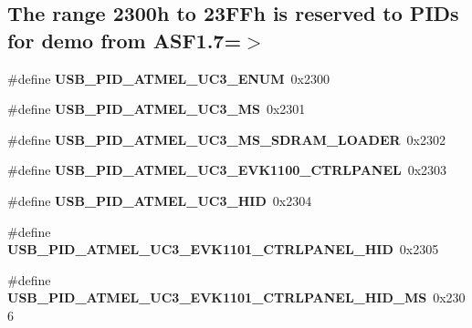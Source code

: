 \subsection*{The range 2300h to 23\+F\+Fh is reserved to P\+I\+Ds for demo from A\+S\+F1.7=$>$}
\begin{DoxyCompactItemize}
\item 
\mbox{\label{group__usb__atmel__ids__group_ga03434816426bc21bbb384f9afe149f1e}} 
\#define {\bfseries U\+S\+B\+\_\+\+P\+I\+D\+\_\+\+A\+T\+M\+E\+L\+\_\+\+U\+C3\+\_\+\+E\+N\+UM}~0x2300
\item 
\mbox{\label{group__usb__atmel__ids__group_ga3c3a8d8fc6c2d20b05e44b34a38c5159}} 
\#define {\bfseries U\+S\+B\+\_\+\+P\+I\+D\+\_\+\+A\+T\+M\+E\+L\+\_\+\+U\+C3\+\_\+\+MS}~0x2301
\item 
\mbox{\label{group__usb__atmel__ids__group_gaf5cf42327c8324b093b5a247d472b525}} 
\#define {\bfseries U\+S\+B\+\_\+\+P\+I\+D\+\_\+\+A\+T\+M\+E\+L\+\_\+\+U\+C3\+\_\+\+M\+S\+\_\+\+S\+D\+R\+A\+M\+\_\+\+L\+O\+A\+D\+ER}~0x2302
\item 
\mbox{\label{group__usb__atmel__ids__group_ga5abb96a63cda4c7fb60a5d56fe2158b2}} 
\#define {\bfseries U\+S\+B\+\_\+\+P\+I\+D\+\_\+\+A\+T\+M\+E\+L\+\_\+\+U\+C3\+\_\+\+E\+V\+K1100\+\_\+\+C\+T\+R\+L\+P\+A\+N\+EL}~0x2303
\item 
\mbox{\label{group__usb__atmel__ids__group_gae36d78d28923e15b4b58680c05d93946}} 
\#define {\bfseries U\+S\+B\+\_\+\+P\+I\+D\+\_\+\+A\+T\+M\+E\+L\+\_\+\+U\+C3\+\_\+\+H\+ID}~0x2304
\item 
\mbox{\label{group__usb__atmel__ids__group_ga90ee7ee99e3d7eecb8eeccc1e233eb0b}} 
\#define {\bfseries U\+S\+B\+\_\+\+P\+I\+D\+\_\+\+A\+T\+M\+E\+L\+\_\+\+U\+C3\+\_\+\+E\+V\+K1101\+\_\+\+C\+T\+R\+L\+P\+A\+N\+E\+L\+\_\+\+H\+ID}~0x2305
\item 
\mbox{\label{group__usb__atmel__ids__group_gad52a705633f06df68872d5b5f1184b15}} 
\#define {\bfseries U\+S\+B\+\_\+\+P\+I\+D\+\_\+\+A\+T\+M\+E\+L\+\_\+\+U\+C3\+\_\+\+E\+V\+K1101\+\_\+\+C\+T\+R\+L\+P\+A\+N\+E\+L\+\_\+\+H\+I\+D\+\_\+\+MS}~0x2306

\end{DoxyCompactItemize}
